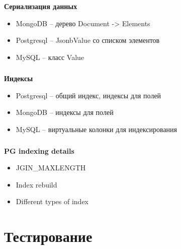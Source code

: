 \documentclass[usenames,dvipsnames, 18pt, compress, aspectratio=169]{beamer}
\begin{document}
\begin{frame}
    \frametitle{}
    \textbf{Сериализация данных}
    \begin{center}
        \begin{itemize}[label={\MVRightarrow}]
            \item MongoDB -- дерево Document -> Elements
            \item Postgresql -- JsonbValue со списком элементов
            \item MySQL -- класс Value
        \end{itemize}
    \end{center}
\end{frame}

\begin{frame}
    \frametitle{}
    \textbf{Индексы}
    \begin{center}
        \begin{itemize}[label={\MVRightarrow}]
            \item Postgresql -- общий индекс, индексы для полей
            \item MongoDB -- индексы для полей
            \item MySQL -- виртуальные колонки для индексирования
        \end{itemize}
    \end{center}
\end{frame}

\begin{frame}
    \frametitle{}
    \textbf{PG indexing details}
    \begin{center}
        \begin{itemize}[label={\MVRightarrow}]
            \item JGIN\_MAXLENGTH
            \item Index rebuild
            \item Different types of index
        \end{itemize}
    \end{center}
\end{frame}

\fontsize{13pt}{14}\selectfont
\section{Тестирование}
\fontsize{17pt}{18}\selectfont
\end{document}

